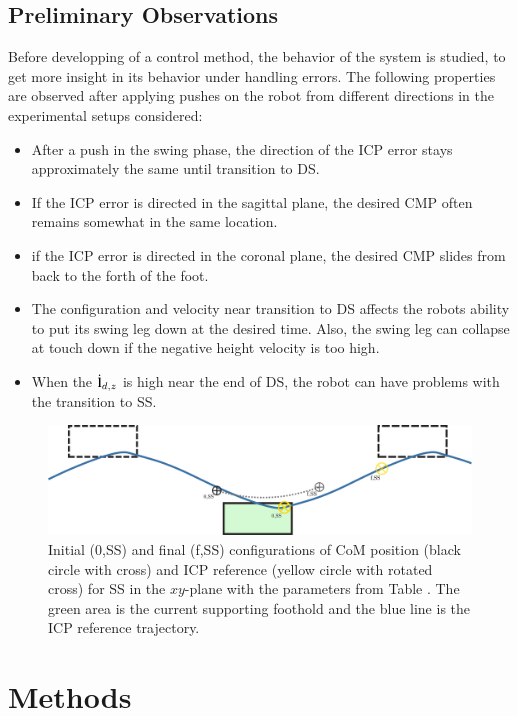 \subsection{Preliminary Observations}
Before developping of a control method, the behavior of the system is studied, to get more insight in its behavior under handling errors. The following properties are observed after applying pushes on the robot from different directions in the experimental setups considered:
\begin{itemize}
	\item After a push in the swing phase, the direction of the \ac{ICP} error stays approximately the same until transition to \ac{DS}.
	\item If the \ac{ICP} error is directed in the sagittal plane, the desired \ac{CMP} often remains somewhat in the same location.
	\item if the \ac{ICP} error is directed  in the coronal plane, the desired \ac{CMP} slides from back to the forth of the foot.
	\item The configuration and velocity near transition to \ac{DS} affects the robots ability to put its swing leg down at the desired time. Also, the swing leg can collapse at touch down if the negative height velocity is too high.
	\item When the $\dot{\mathbf{l}}_{d,z}$ is high near the end of \ac{DS}, the robot can have problems with the transition to \ac{SS}.
\end{itemize}

\begin{figure}[h]
\centering
  \includegraphics[width=.8\linewidth]{STYLESTUFF/ICPplan3StepComICPrSS.png}
   \caption{Initial (0,SS) and final (f,SS) configurations of \ac{CoM} position (black circle with cross) and \ac{ICP} reference (yellow circle with rotated cross) for \ac{SS} in the $xy$-plane with the parameters from Table . The green area is the current supporting foothold and the blue line is the \ac{ICP} reference trajectory.}
    \label{fig:3foot}
\end{figure}

\newpage
\section{Methods}

